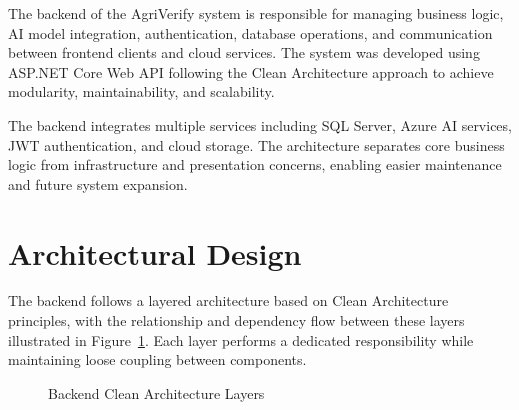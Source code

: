 


The backend of the AgriVerify system is responsible for managing business logic, AI model integration, authentication, database operations, and communication between frontend clients and cloud services. The system was developed using ASP.NET Core Web API following the Clean Architecture approach to achieve modularity, maintainability, and scalability.

The backend integrates multiple services including SQL Server, Azure AI services, JWT authentication, and cloud storage. The architecture separates core business logic from infrastructure and presentation concerns, enabling easier maintenance and future system expansion.

\section{Architectural Design}
\label{sec:backend-architecture}

The backend follows a layered architecture based on Clean Architecture principles, with the relationship and dependency flow between these layers illustrated in Figure~\ref{fig:backend-clean-architecture}. Each layer performs a dedicated responsibility while maintaining loose coupling between components.

\begin{figure}[H]
\centering


\caption{Backend Clean Architecture Layers}
\label{fig:backend-clean-architecture}

\end{figure}

